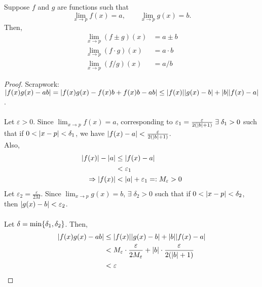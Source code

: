 \documentclass[12pt]{article}
\begin{document}
\begin{thm} \label{thm:func limit laws}
    Suppose $f$ and $g$ are functions such that \[
        \lim_{x \to p} f(x) = a, \qquad \lim_{x \to p} g(x) = b.
    \] Then,
    \begin{align}
        \lim_{x \to p} (f \pm g)(x) &= a \pm b \\
        \lim_{x \to p} (f \cdot g)(x) &= a \cdot b \\
        \lim_{x \to p} (f/g)(x) &= a/b
    \end{align}
\end{thm}
\begin{proof}
    Scrapwork: $\abs{ f(x) g(x) - ab } = \abs{ f(x)g(x) - f(x) b + f(x) b - ab } \leq  \abs{ f(x) } \abs{ g(x) - b } + \abs{ b } \abs{ f(x) - a }$.
    \\\\
    Let $\varepsilon > 0$. Since $\lim_{x \to p} f(x) = a$, corresponding to $\varepsilon_{1} = \frac{\varepsilon}{2(\abs{ b } + 1)} \;\exists\; \delta_{1} > 0 $ such that if $0 < \abs{ x - p } < \delta_{1}$, we have $\abs{ f(x) - a } < \frac{\varepsilon}{2(\abs{ b } + 1)}$. \\
    Also, \begin{align*}
        \abs{ f(x) } - \abs{ a} &\leq  \abs{ f(x) - a } \\
        &< \varepsilon_{1} \\
        \implies \abs{ f(x) } &< \abs{ a } + \varepsilon_{1} =: M_{\varepsilon} > 0
    \end{align*}
    Let $\varepsilon_{2} = \frac{\varepsilon}{2M}$. Since $\lim_{x \to p} g(x) = b$, $\exists\; \delta_{2} > 0$ such that if $0 < \abs{ x - p } < \delta_{2}$, then $\abs{ g(x) - b } < \varepsilon_{2}$.
    \\\\
    Let $\delta = \min\set{\delta_{1}, \delta_{2}}$. Then,
    \begin{align*}
        \abs{ f(x) g(x) - ab } &\leq \abs{ f(x) } \abs{ g(x) - b} + \abs{ b } \abs{ f(x) - a } \\
        &< M_{\varepsilon} \cdot \frac{\varepsilon}{2 M_{\varepsilon}} + \abs{ b } \cdot \frac{\varepsilon}{2(\abs{ b} + 1)} \\
        &< \varepsilon \qedhere
    \end{align*}
\end{proof}
\end{document}
